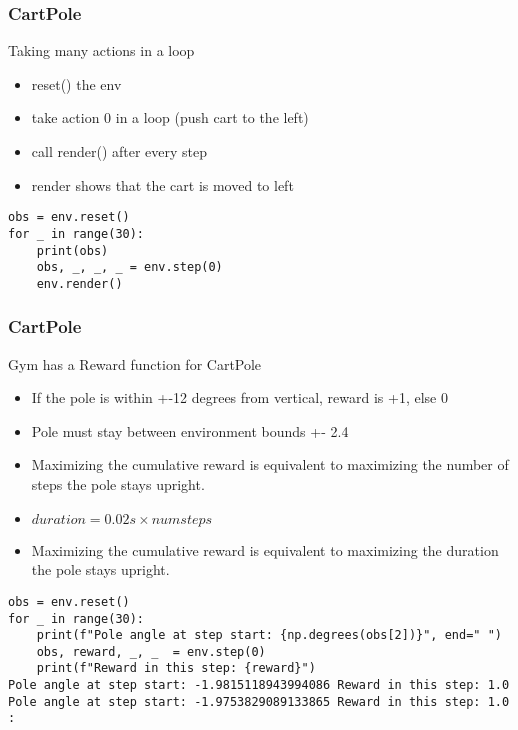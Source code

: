 \begin{frame}[fragile]\frametitle{CartPole}

Taking many actions in a loop

\begin{itemize}
\item reset() the env
\item take action 0 in a loop (push cart to the left)
\item call render() after every step
\item render shows that the cart is moved to left
\end{itemize}

\begin{lstlisting}
obs = env.reset()
for _ in range(30):
    print(obs)
    obs, _, _, _ = env.step(0)
    env.render()
\end{lstlisting}


\end{frame}

\begin{frame}[fragile]\frametitle{CartPole}

Gym has a Reward function for CartPole
\begin{itemize}
\item If the pole is within +-12 degrees from vertical, reward is +1, else 0
\item Pole must  stay between environment bounds +- 2.4
\item Maximizing the cumulative reward is equivalent to maximizing the number of steps the pole stays upright.
\item $duration=0.02s \times num steps$
\item Maximizing the cumulative reward is equivalent to maximizing the duration the pole stays upright.
\end{itemize}

\begin{lstlisting}
obs = env.reset()
for _ in range(30):
    print(f"Pole angle at step start: {np.degrees(obs[2])}", end=" ")
    obs, reward, _, _  = env.step(0)
    print(f"Reward in this step: {reward}")
Pole angle at step start: -1.9815118943994086 Reward in this step: 1.0
Pole angle at step start: -1.9753829089133865 Reward in this step: 1.0
:		
\end{lstlisting}


\end{frame}

